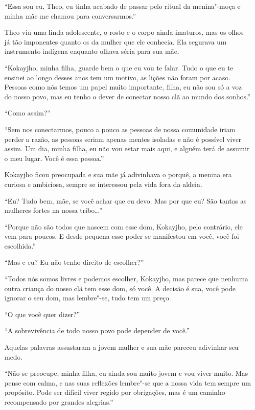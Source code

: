 ``Essa sou eu, Theo, eu tinha acabado de passar pelo ritual da
menina"-moça e minha mãe me chamou para conversarmos.''

Theo viu uma linda adolescente, o rosto e o corpo ainda imaturos, mas os
olhos já tão imponentes quanto os da mulher que ele conhecia. Ela
segurava um instrumento indígena enquanto olhava séria para sua mãe.

``Kokayjho, minha filha, guarde bem o que eu vou te falar. Tudo o que eu
te ensinei ao longo desses anos tem um motivo, as lições não foram por
acaso. Pessoas como nós temos um papel muito importante, filha, eu não
sou só a voz do nosso povo, mas eu tenho o dever de conectar nosso clã
ao mundo dos sonhos.''

``Como assim?''

``Sem nos conectarmos, pouco a pouco as pessoas de nossa comunidade
iriam perder a razão, as pessoas seriam apenas mentes isoladas e não é
possível viver assim. Um dia, minha filha, eu não vou estar mais aqui, e
alguém terá de assumir o meu lugar. Você é essa pessoa.''

Kokayjho ficou preocupada e sua mãe já adivinhava o porquê, a menina era
curiosa e ambiciosa, sempre se interessou pela vida fora da aldeia.

``Eu? Tudo bem, mãe, se você achar que eu devo. Mas por que eu? São
tantas as mulheres fortes na nossa tribo\ldots{}''

``Porque não são todos que nascem com esse dom, Kokayjho, pelo
contrário, ele vem para poucos. E desde pequena esse poder se manifestou
em você, você foi escolhida.''

``Mas e eu? Eu não tenho direito de escolher?''

``Todos nós somos livres e podemos escolher, Kokayjho, mas parece que
nenhuma outra criança do nosso clã tem esse dom, só você. A decisão é
sua, você pode ignorar o seu dom, mas lembre"-se, tudo tem um preço.

``O que você quer dizer?''

``A sobrevivência de todo nosso povo pode depender de você.''

Aquelas palavras assustaram a jovem mulher e sua mãe pareceu adivinhar
seu medo.

``Não se preocupe, minha filha, eu ainda sou muito jovem e vou viver
muito. Mas pense com calma, e nas suas reflexões lembre"-se que a nossa
vida tem sempre um propósito. Pode ser difícil viver regido por
obrigações, mas é um caminho recompensado por grandes alegrias.''

